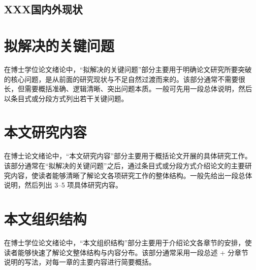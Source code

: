 \subsection{XXX国内外现状}

\section{拟解决的关键问题}

在博士学位论文绪论中，“拟解决的关键问题”部分主要用于明确论文研究所要突破的核心问题，是从前面的研究现状与不足自然过渡而来的。该部分通常不需要很长，但需要概括准确、逻辑清晰、突出问题本质。一般可先用一段总体说明，然后以条目式或分段方式列出若干关键问题。

\section{本文研究内容}

在博士论文绪论中，“本文研究内容”部分主要用于概括论文开展的具体研究工作。该部分通常在“拟解决的关键问题”之后，通过条目式或分段方式介绍论文的主要研究内容，使读者能够清晰了解论文各项研究工作的整体结构。一般先给出一段总体说明，然后列出 3–5 项具体研究内容。

\section{本文组织结构}

在博士学位论文绪论中，“本文组织结构”部分主要用于介绍论文各章节的安排，使读者能够快速了解论文整体结构与内容分布。该部分通常采用一段总述 + 分章节说明的写法，对每一章的主要内容进行简要概括。